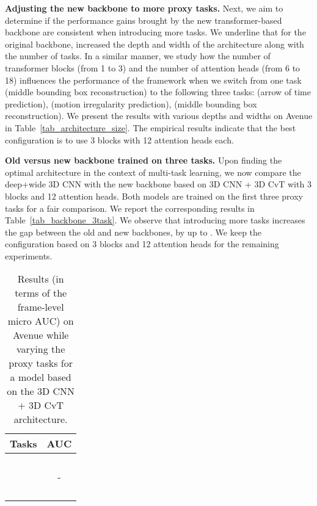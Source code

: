 \documentclass[times,twocolumn,final,authoryear]{elsarticle}
\begin{document}
\noindent
{\bf Adjusting the new backbone to more proxy tasks.}
Next, we aim to determine if the performance gains brought by the new transformer-based backbone are consistent when introducing more tasks. We underline that for the original backbone, \cite{Georgescu-CVPR-2021} increased the depth and width of the architecture along with the number of tasks. In a similar manner, we study how the number of transformer blocks (from 1 to 3) and the number of attention heads (from 6 to 18) influences the performance of the framework when we switch from one task (middle bounding box reconstruction) to the following three tasks:  (arrow of time prediction),  (motion irregularity prediction),  (middle bounding box reconstruction). We present the results with various depths and widths on Avenue in Table~\ref{tab_architecture_size}. The empirical results indicate that the best configuration is to use 3 blocks with 12 attention heads each.

\noindent
{\bf Old versus new backbone trained on three tasks.}
Upon finding the optimal architecture in the context of multi-task learning, we now compare the deep+wide 3D CNN with the new backbone based on 3D CNN + 3D CvT with 3 blocks and 12 attention heads. Both models are trained on the first three proxy tasks for a fair comparison. We report the corresponding results in Table~\ref{tab_backbone_3task}. We observe that introducing more tasks increases the gap between the old and new backbones, by up to . We keep the configuration based on 3 blocks and 12 attention heads for the remaining experiments.

\begin{table}[t]
\caption{Results (in terms of the frame-level micro AUC) on Avenue while varying the proxy tasks for a model based on the 3D CNN + 3D CvT architecture.}\label{tab:alone_proxy_tasks}
\begin{center}
\begin{tabular}{|l|c|}
\hline
{Tasks}                            & {AUC} \\
\hline\hline
                       &  \\
                       &  \\
                       &  \\
                       &  \\
                       & - \\
                       &  \\
                       &  \\
                       &  \\
                       &  \\
\hline
\end{tabular}
\end{center}
\end{table}
\end{document}

